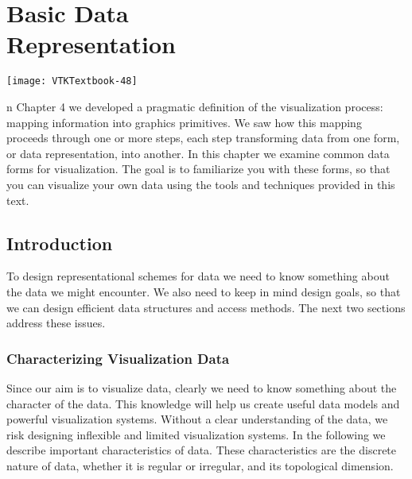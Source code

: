 \chapter[Basic Data Representation]{Basic Data\\ Representation}
\label{chap:basic_data_representation}

\vspace{-9\baselineskip} %
\hfill
 \begin{minipage}{0.5\textwidth}
 \centering
 \texttt{[image: VTKTextbook-48]}
 \end{minipage}
\vspace{2\baselineskip}

n Chapter 4 we developed a pragmatic definition of the visualization process: mapping information into graphics primitives.
We saw how this mapping proceeds through one or more steps, each step transforming data from one form, or data representation, into another.
In this chapter we examine common data forms for visualization.
The goal is to familiarize you with these forms, so that you can visualize your own data using the tools and techniques provided in this text.

\section{Introduction}
To design representational schemes for data we need to know something about the data we might
encounter. We also need to keep in mind design goals, so that we can design efficient data structures
and access methods. The next two sections address these issues.

\subsection{Characterizing Visualization Data}

Since our aim is to visualize data, clearly we need to know something about the character of the data. This knowledge will help us create useful data models and powerful visualization systems. Without a clear understanding of the data, we risk designing inflexible and limited visualization systems. In the following we describe important characteristics of data. These characteristics are the discrete nature of data, whether it is regular or irregular, and its topological dimension.

